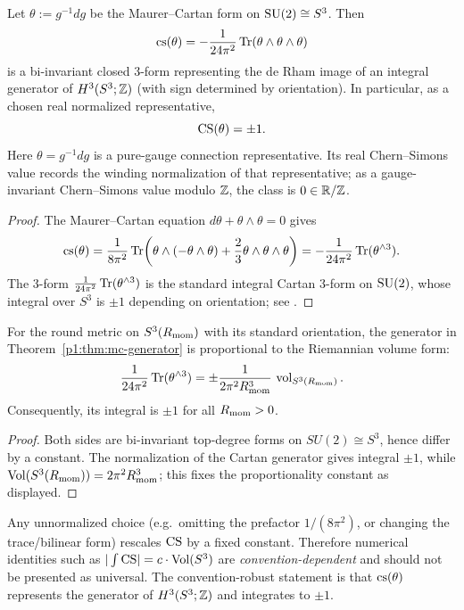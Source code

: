 \documentclass[11pt]{article}
\begin{document}
\begin{theorem}\label{p1:thm:mc-generator}
Let $\theta:=g^{-1}dg$ be the Maurer--Cartan form on $\mathrm{SU}(2)\cong S^3$.
Then
\[
\mathrm{cs}(\theta)=-\frac{1}{24\pi^2}\operatorname{Tr}(\theta\wedge\theta\wedge\theta)
\]
is a bi-invariant closed 3-form representing the de Rham image of an integral generator of $H^3(S^3;\mathbb{Z})$
(with sign determined by orientation). In particular, as a chosen real normalized representative,
\[
\mathrm{CS}(\theta)=\pm 1.
\]
Here \(\theta=g^{-1}dg\) is a pure-gauge connection representative.  Its real Chern--Simons value records the winding normalization of that representative; as a gauge-invariant Chern--Simons value modulo \(\mathbb{Z}\), the class is \(0\in\mathbb{R}/\mathbb{Z}\).
\end{theorem}

\begin{proof}
The Maurer--Cartan equation $d\theta+\theta\wedge\theta=0$ gives
\[
\mathrm{cs}(\theta)
=\frac{1}{8\pi^2}\operatorname{Tr}\!\left(\theta\wedge(-\theta\wedge\theta)+\frac{2}{3}\theta\wedge\theta\wedge\theta\right)
=-\frac{1}{24\pi^2}\operatorname{Tr}(\theta^{\wedge 3}).
\]
The 3-form $\frac{1}{24\pi^2}\operatorname{Tr}(\theta^{\wedge 3})$ is the standard integral Cartan 3-form on $\mathrm{SU}(2)$,
whose integral over $S^3$ is $\pm 1$ depending on orientation; see \cite{bott1982differential}.
\end{proof}

\begin{corollary}\label{p1:cor:cs-volume-relation}
For the round metric on $S^3(R_{\mathrm{mom}})$ with its standard orientation, the generator in
Theorem~\ref{p1:thm:mc-generator} is proportional to the Riemannian volume form:
\[
\frac{1}{24\pi^2}\operatorname{Tr}(\theta^{\wedge 3})
=\pm \frac{1}{2\pi^2R_{\mathrm{mom}}^3}\,\operatorname{vol}_{S^3(R_{\mathrm{mom}})}.
\]
Consequently, its integral is $\pm 1$ for all $R_{\mathrm{mom}}>0$.
\end{corollary}

\begin{proof}
Both sides are bi-invariant top-degree forms on \(SU(2)\cong S^3\), hence differ by a constant. The normalization of the Cartan generator gives integral \(\pm1\), while \(\operatorname{Vol}(S^3(R_{\mathrm{mom}}))=2\pi^2R_{\mathrm{mom}}^3\); this fixes the proportionality constant as displayed.
\end{proof}


\begin{remark}
Any unnormalized choice (e.g.\ omitting the prefactor $1/(8\pi^2)$, or changing the trace/bilinear form) rescales $\mathrm{CS}$ by a fixed constant. Therefore numerical identities such as $|\int \mathrm{CS}| = c\cdot\operatorname{Vol}(S^3)$ are \emph{convention-dependent} and should not be presented as universal. The convention-robust statement is that $\mathrm{cs}(\theta)$ represents the generator of $H^3(S^3;\mathbb{Z})$ and integrates to $\pm 1$.
\end{remark}
\end{document}
